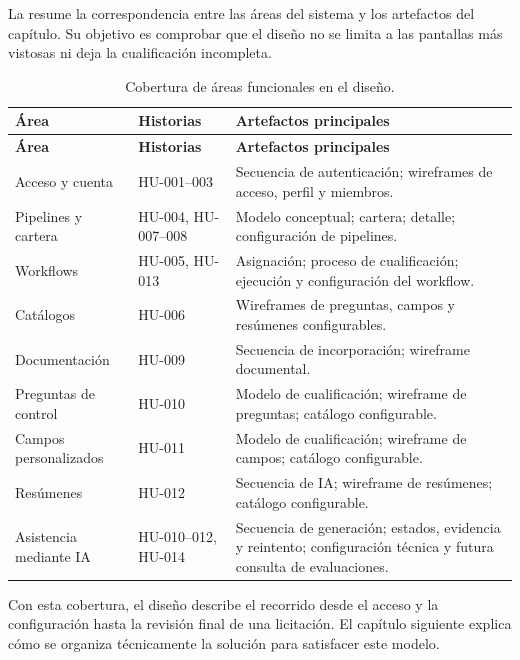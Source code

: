 La  resume la correspondencia entre las áreas del
sistema y los artefactos del capítulo. Su objetivo es comprobar que el diseño
no se limita a las pantallas más vistosas ni deja la cualificación incompleta.

\footnotesize
\begin{longtable}{L{3.5cm} L{4.15cm} L{5.7cm}}
  \caption{Cobertura de áreas funcionales en el diseño.}
  \label{tab:design-coverage}\\
  \toprule
  \textbf{Área} & \textbf{Historias} & \textbf{Artefactos principales} \\
  \midrule
  \endfirsthead
  \toprule
  \textbf{Área} & \textbf{Historias} & \textbf{Artefactos principales} \\
  \midrule
  \endhead
  \bottomrule
  \endfoot
  Acceso y cuenta & HU-001--003 & Secuencia de autenticación; wireframes de
    acceso, perfil y miembros. \\
  Pipelines y cartera & HU-004, HU-007--008 & Modelo conceptual; cartera;
    detalle; configuración de pipelines. \\
  Workflows & HU-005, HU-013 & Asignación; proceso de cualificación; ejecución y
    configuración del workflow. \\
  Catálogos & HU-006 & Wireframes de preguntas, campos y resúmenes
    configurables. \\
  Documentación & HU-009 & Secuencia de incorporación; wireframe documental. \\
  Preguntas de control & HU-010 & Modelo de cualificación; wireframe de preguntas;
    catálogo configurable. \\
  Campos personalizados & HU-011 & Modelo de cualificación; wireframe de campos;
    catálogo configurable. \\
  Resúmenes & HU-012 & Secuencia de IA; wireframe de resúmenes; catálogo
    configurable. \\
  Asistencia mediante IA & HU-010--012, HU-014 & Secuencia de generación;
    estados, evidencia y reintento; configuración técnica y futura consulta de evaluaciones. \\
\end{longtable}
\normalsize

Con esta cobertura, el diseño describe el recorrido desde el acceso y la
configuración hasta la revisión final de una licitación. El capítulo siguiente
explica cómo se organiza técnicamente la solución para satisfacer este modelo.
